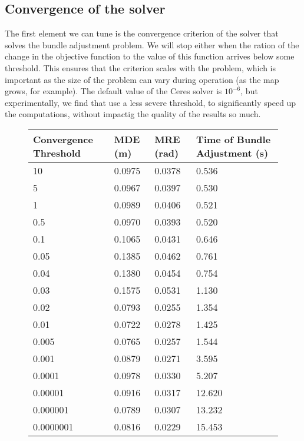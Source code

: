 \subsection{Convergence of the solver}
The first element we can tune is the convergence criterion of the solver that solves the bundle adjustment problem. We will stop either when the ration of the change in the objective function to the value of this function arrives below some threshold. This ensures that the criterion scales with the problem, which is important as the size of the problem can vary during operation (as the map grows, for example). The default value of the Ceres solver is $10^{-6}$, but experimentally, we find that use a less severe threshold, to significantly speed up the computations, without impactig the quality of the results so much.
\begin{figure}[H]
  \begin{center}
    \begin{tabular}{ | l | l | l | l | }
      \hline
      Convergence Threshold &     MDE (m) & MRE (rad) & Time of Bundle Adjustment (s) \\ \hline \hline
      10                    &     0.0975  &   0.0378  &     0.536 \\ \hline
      5                     &     0.0967  &   0.0397  &     0.530 \\ \hline
      1                     &     0.0989  &   0.0406  &     0.521 \\ \hline
      0.5                   &     0.0970  &   0.0393  &     0.520 \\ \hline
      0.1                   &     0.1065  &   0.0431  &     0.646 \\ \hline
      0.05                  &     0.1385  &   0.0462  &     0.761 \\ \hline
      0.04                  &     0.1380  &   0.0454  &     0.754 \\ \hline
      0.03                  &     0.1575  &   0.0531  &     1.130 \\ \hline
      0.02                  &     0.0793  &   0.0255  &     1.354 \\ \hline
      0.01                  &     0.0722  &   0.0278  &     1.425 \\ \hline
      0.005                 &     0.0765  &   0.0257  &     1.544 \\ \hline
      0.001                 &     0.0879  &   0.0271  &     3.595 \\ \hline
      0.0001                &     0.0978  &   0.0330  &     5.207 \\ \hline
      0.00001               &     0.0916  &   0.0317  &     12.620 \\ \hline
      0.000001              &     0.0789  &   0.0307  &     13.232 \\ \hline
      0.0000001             &     0.0816  &   0.0229  &     15.453 \\
      \hline
    \end{tabular}
  \end{center}
\end{figure}



